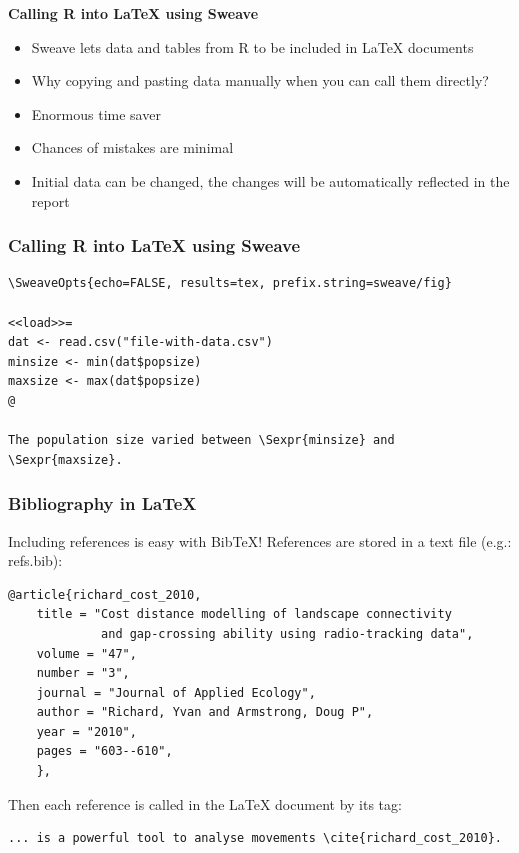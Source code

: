 \documentclass[9pt,xcolor=pdftex,dvipsnames,table]{beamer}
\begin{document}
\begin{frame}{\textbf{Calling R into LaTeX using Sweave}}
  \begin{itemize}
  \item Sweave lets data and tables from R to be included in LaTeX documents
  \item Why copying and pasting data manually when you can call them directly?
  \item Enormous time saver
  \item Chances of mistakes are minimal
  \item Initial data can be changed, the changes will be automatically
    reflected in the report 
  \end{itemize}
\end{frame}


\begin{frame}[fragile] %
\frametitle{\textbf{Calling R into LaTeX using Sweave}}
\begin{example}[]
\begin{verbatim}
\SweaveOpts{echo=FALSE, results=tex, prefix.string=sweave/fig}

<<load>>=
dat <- read.csv("file-with-data.csv")
minsize <- min(dat$popsize)
maxsize <- max(dat$popsize)
@ 

The population size varied between \Sexpr{minsize} and \Sexpr{maxsize}.
\end{verbatim}
\end{example}
\end{frame}


\begin{frame}[fragile] %
\frametitle{\textbf{Bibliography in LaTeX}}
Including references is easy with BibTeX!
References are stored in a text file (e.g.: refs.bib):
\begin{verbatim}
@article{richard_cost_2010,
    title = "Cost distance modelling of landscape connectivity 
             and gap-crossing ability using radio-tracking data",
    volume = "47",
    number = "3",
    journal = "Journal of Applied Ecology",
    author = "Richard, Yvan and Armstrong, Doug P",
    year = "2010",
    pages = "603--610",
    },
\end{verbatim}
Then each reference is called in the LaTeX document by its tag:
\begin{verbatim}
... is a powerful tool to analyse movements \cite{richard_cost_2010}.
\end{verbatim}
\end{frame}
\end{document}
